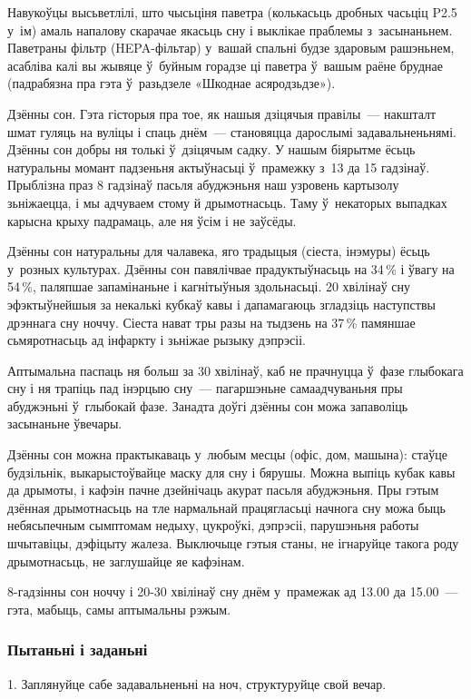 Навукоўцы высьветлілі, што чысьціня паветра (колькасьць дробных часьціц P2.5 у~ім) амаль напалову скарачае якасьць сну і выклікае праблемы з~засынаньнем. Паветраны фільтр (HEPA-фільтар) у~вашай спальні будзе здаровым рашэньнем, асабліва калі вы жывяце ў~буйным горадзе ці паветра ў~вашым раёне бруднае (падрабязна пра гэта ў~разьдзеле «Шкоднае асяродзьдзе»).

Дзённы сон. Гэта гісторыя пра тое, як нашыя дзіцячыя правілы~--- накшталт шмат гуляць на вуліцы і спаць днём~--- становяцца дарослымі задавальненьнямі. Дзённы сон добры ня толькі ў~дзіцячым садку. У нашым біярытме ёсьць натуральны момант падзеньня актыўнасьці ў~прамежку з~13 да 15 гадзінаў. Прыблізна праз 8 гадзінаў пасьля абуджэньня наш узровень картызолу зьніжаецца, і мы адчуваем стому й дрымотнасьць. Таму ў~некаторых выпадках карысна крыху падрамаць, але ня ўсім і не заўсёды.

Дзённы сон натуральны для чалавека, яго традыцыя (сіеста, інэмуры) ёсьць у~розных культурах. Дзённы сон павялічвае прадуктыўнасьць на 34\,\% і ўвагу на 54\,\%, паляпшае запамінаньне і кагнітыўныя здольнасьці. 20 хвілінаў сну эфэктыўнейшыя за некалькі кубкаў кавы і дапамагаюць згладзіць наступствы дрэннага сну ноччу. Сіеста нават тры разы на тыдзень на 37\,\% памяншае сьмяротнасьць ад інфаркту і зьніжае рызыку дэпрэсіі.

Аптымальна паспаць ня больш за 30 хвілінаў, каб не прачнуцца ў~фазе глыбокага сну і ня трапіць пад інэрцыю сну~--- пагаршэньне самаадчуваньня пры абуджэньні ў~глыбокай фазе. Занадта доўгі дзённы сон можа запаволіць засынаньне ўвечары.

Дзённы сон можна практыкаваць у~любым месцы (офіс, дом, машына): стаўце будзільнік, выкарыстоўвайце маску для сну і бярушы. Можна выпіць кубак кавы да дрымоты, і кафэін пачне дзейнічаць акурат пасьля абуджэньня. Пры гэтым дзённая дрымотнасьць на тле нармальнай працягласьці начнога сну можа быць небясьпечным сымптомам недыху, цукроўкі, дэпрэсіі, парушэньня работы шчытавіцы, дэфіцыту жалеза. Выключыце гэтыя станы, не ігнаруйце такога роду дрымотнасьць, не заглушайце яе кафэінам.

8-гадзінны сон ноччу і 20-30 хвілінаў сну днём у~прамежак ад 13.00 да 15.00~--- гэта, мабыць, самы аптымальны рэжым.

\subsubsection{Пытаньні і заданьні}

1. Заплянуйце сабе задавальненьні на ноч, структуруйце свой вечар.

